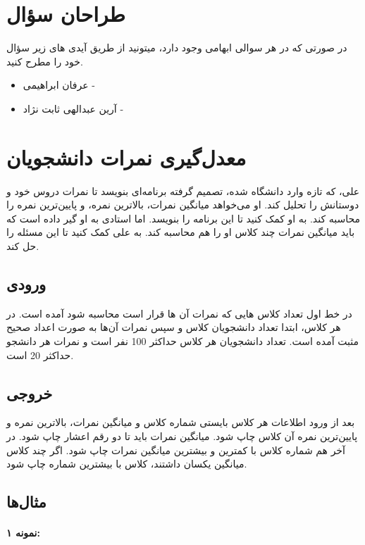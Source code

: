 \documentclass{article}
\begin{document}
\section{طراحان سؤال}
در صورتی که در هر سوالی ابهامی وجود دارد، میتونید از طریق آیدی های زیر سؤال خود را
مطرح کنید.

\begin{itemize}
    \item عرفان ابراهیمی - 
    \item آرین عبدالهی ثابت نژاد - 
\end{itemize}

\pagebreak

\section{معدل‌گیری نمرات دانشجویان}

علی، که تازه وارد دانشگاه شده، تصمیم گرفته برنامه‌ای بنویسد تا نمرات دروس خود و دوستانش را تحلیل کند. او می‌خواهد میانگین نمرات، بالاترین نمره، و پایین‌ترین نمره را محاسبه کند. به او کمک کنید تا این برنامه را بنویسد. اما استادی به او گیر داده است که باید میانگین نمرات چند کلاس او را هم محاسبه کند. به علی کمک کنید تا این مسئله را حل کند.

\subsection{ورودی}

در خط اول تعداد کلاس هایی که نمرات آن ها قرار است محاسبه شود آمده است. در هر کلاس، ابتدا
تعداد دانشجویان کلاس و سپس نمرات آن‌ها به صورت اعداد صحیح مثبت آمده است. تعداد دانشجویان هر کلاس حداکثر 100 نفر است و نمرات هر دانشجو حداکثر 20 است.

\subsection{خروجی}

بعد از ورود اطلاعات هر کلاس بایستی شماره کلاس و میانگین نمرات، بالاترین نمره و پایین‌ترین نمره آن کلاس چاپ شود. میانگین نمرات باید تا دو رقم اعشار چاپ شود.
در آخر هم شماره کلاس با کمترین و بیشترین میانگین نمرات چاپ شود. اگر چند کلاس میانگین
یکسان داشتند، کلاس با بیشترین شماره چاپ شود.

\subsection{مثال‌ها}

\paragraph{نمونه ۱:}
\end{document}
